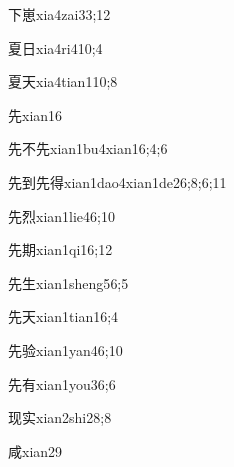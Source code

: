 \begin{verbete}{下崽}{xia4zai3}{3;12}
\end{verbete}
\begin{verbete}{夏日}{xia4ri4}{10;4}
\end{verbete}
\begin{verbete}{夏天}{xia4tian1}{10;8}
\end{verbete}
\begin{verbete}{先}{xian1}{6}
\end{verbete}
\begin{verbete}{先不先}{xian1bu4xian1}{6;4;6}
\end{verbete}
\begin{verbete}{先到先得}{xian1dao4xian1de2}{6;8;6;11}
\end{verbete}
\begin{verbete}{先烈}{xian1lie4}{6;10}
\end{verbete}
\begin{verbete}{先期}{xian1qi1}{6;12}
\end{verbete}
\begin{verbete}{先生}{xian1sheng5}{6;5}
\end{verbete}
\begin{verbete}{先天}{xian1tian1}{6;4}
\end{verbete}
\begin{verbete}{先验}{xian1yan4}{6;10}
\end{verbete}
\begin{verbete}{先有}{xian1you3}{6;6}
\end{verbete}
\begin{verbete}{现实}{xian2shi2}{8;8}
\end{verbete}
\begin{verbete}{咸}{xian2}{9}
\end{verbete}
